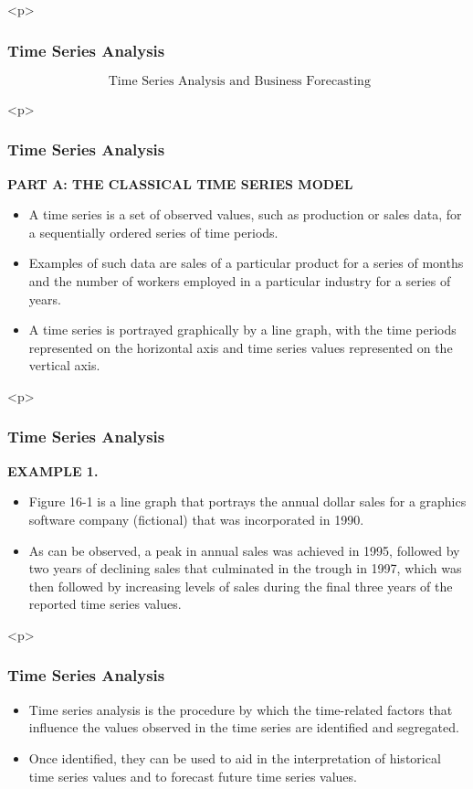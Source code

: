 \documentclass{beamer}
\begin{document}
<p>
\frametitle{Time Series Analysis}
\huge
\[ \mbox{ Time Series Analysis
and Business
Forecasting} \]


<p>
\frametitle{Time Series Analysis}
\textbf{PART A: THE CLASSICAL TIME SERIES MODEL}
\begin{itemize}
\item A time series is a set of observed values, such as production or sales data, for a sequentially ordered series
of time periods. 
\item Examples of such data are sales of a particular product for a series of months and the number of
workers employed in a particular industry for a series of years. 
\item A time series is portrayed graphically by a line
graph, with the time periods represented on the horizontal axis and time series values
represented on the vertical axis.
\end{itemize}

<p>
\frametitle{Time Series Analysis}
\textbf{EXAMPLE 1.}
\begin{itemize}
\item  Figure 16-1 is a line graph that portrays the annual dollar sales for a graphics software company (fictional)
that was incorporated in 1990. 
\item As can be observed, a peak in annual sales was achieved in 1995, followed by two years of
declining sales that culminated in the trough in 1997, which was then followed by increasing levels of sales during the
final three years of the reported time series values.
\end{itemize}

<p>
\frametitle{Time Series Analysis}
\begin{itemize}
\item Time series analysis is the procedure by which the time-related factors that influence the values observed in
the time series are identified and segregated. 
\item Once identified, they can be used to aid in the interpretation of
historical time series values and to forecast future time series values. 
\end{itemize}
\end{document}
